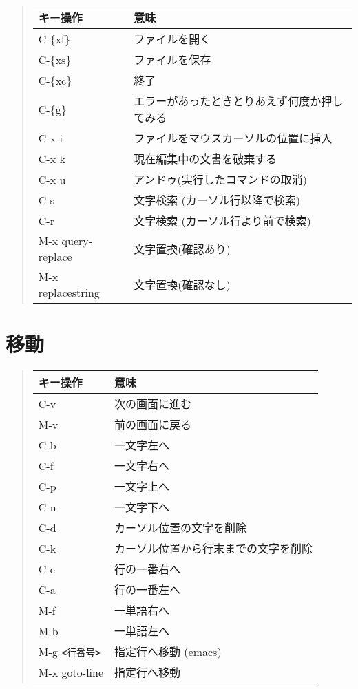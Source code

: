 \documentclass{jreport}
\begin{document}
\begin{quote}
\begin{tabular}[t]{ll}\hline
キー操作 & 意味 \\ \hline
C-\{xf\} & ファイルを開く \\
C-\{xs\} & ファイルを保存 \\
C-\{xc\} & 終了 \\
C-\{g\} & エラーがあったときとりあえず何度か押してみる \\
C-x i & ファイルをマウスカーソルの位置に挿入 \\
C-x k & 現在編集中の文書を破棄する \\
C-x u & アンドゥ(実行したコマンドの取消)\\
C-s & 文字検索 (カーソル行以降で検索)\\
C-r & 文字検索 (カーソル行より前で検索)\\
M-x query-replace & 文字置換(確認あり) \\
M-x replacestring & 文字置換(確認なし)\\
\hline
\end{tabular}
\end{quote}

\section{移動}

\begin{quote}
\begin{tabular}[t]{ll}\hline
キー操作 & 意味 \\ \hline
C-v & 次の画面に進む\\
M-v & 前の画面に戻る \\
C-b & 一文字左へ \\
C-f & 一文字右へ \\
C-p & 一文字上へ \\
C-n & 一文字下へ \\
C-d & カーソル位置の文字を削除 \\
C-k & カーソル位置から行末までの文字を削除 \\
C-e & 行の一番右へ\\
C-a & 行の一番左へ\\
M-f & 一単語右へ\\
M-b & 一単語左へ\\
M-g \verb|<行番号>| & 指定行へ移動 (emacs)\\
M-x goto-line& 指定行へ移動 \\
\hline
\end{tabular}
\end{quote}
\end{document}
